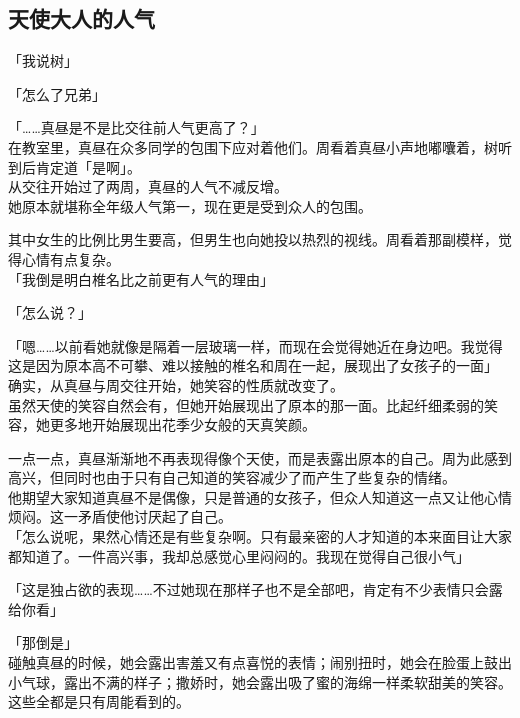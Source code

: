 \subsection{天使大人的人气}

「我说树」

「怎么了兄弟」

「……真昼是不是比交往前人气更高了？」\\

在教室里，真昼在众多同学的包围下应对着他们。周看着真昼小声地嘟囔着，树听到后肯定道「是啊」。\\

从交往开始过了两周，真昼的人气不减反增。\\

她原本就堪称全年级人气第一，现在更是受到众人的包围。

其中女生的比例比男生要高，但男生也向她投以热烈的视线。周看着那副模样，觉得心情有点复杂。\\

「我倒是明白椎名比之前更有人气的理由」

「怎么说？」

「嗯……以前看她就像是隔着一层玻璃一样，而现在会觉得她近在身边吧。我觉得这是因为原本高不可攀、难以接触的椎名和周在一起，展现出了女孩子的一面」\\

确实，从真昼与周交往开始，她笑容的性质就改变了。\\

虽然天使的笑容自然会有，但她开始展现出了原本的那一面。比起纤细柔弱的笑容，她更多地开始展现出花季少女般的天真笑颜。

一点一点，真昼渐渐地不再表现得像个天使，而是表露出原本的自己。周为此感到高兴，但同时也由于只有自己知道的笑容减少了而产生了些复杂的情绪。\\

他期望大家知道真昼不是偶像，只是普通的女孩子，但众人知道这一点又让他心情烦闷。这一矛盾使他讨厌起了自己。\\

「怎么说呢，果然心情还是有些复杂啊。只有最亲密的人才知道的本来面目让大家都知道了。一件高兴事，我却总感觉心里闷闷的。我现在觉得自己很小气」

「这是独占欲的表现……不过她现在那样子也不是全部吧，肯定有不少表情只会露给你看」

「那倒是」\\

碰触真昼的时候，她会露出害羞又有点喜悦的表情；闹别扭时，她会在脸蛋上鼓出小气球，露出不满的样子；撒娇时，她会露出吸了蜜的海绵一样柔软甜美的笑容。这些全都是只有周能看到的。\\

